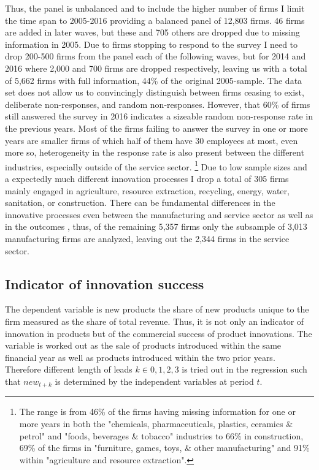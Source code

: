 Thus, the panel is unbalanced and to include the higher number of firms I limit the time span to 2005-2016 providing a balanced panel of 12,803 firms. 46 firms are added in later waves, but these and 705 others are dropped due to missing information in 2005. Due to firms stopping to respond to the survey I need to drop 200-500 firms from the panel each of the following waves, but for 2014 and 2016 where 2,000 and 700 firms are dropped respectively, leaving us with a total of 5,662 firms with full information, 44\% of the original 2005-sample. The data set does not allow us to  convincingly distinguish between firms ceasing to exist, deliberate non-responses, and random non-responses. However, that 60\% of firms still answered the survey in 2016 indicates a sizeable random non-response rate in the previous years. Most of the firms failing to answer the survey in one or more years are smaller firms of which half of them have 30 employees at most, even more so, heterogeneity in the response rate is also present between the different industries, especially outside of the service sector.
\footnote{The range is from 46\% of the firms having missing information for one or more years in both the "chemicals, pharmaceuticals, plastics, ceramics \& petrol" and "foods, beverages \& tobacco" industries to 66\% in construction, 69\% of the firms in "furniture, games, toys, \& other manufacturing" and 91\% within "agriculture and resource extraction".}
Due to low sample sizes and a expectedly much different innovation processes I drop a total of 305 firms mainly engaged in agriculture, resource extraction, recycling, energy, water, sanitation, or construction. There can be fundamental differences in the innovative processes even between the manufacturing and service sector \citep{hoffman1998small} as well as in the outcomes \citep{harrison2014does}, thus, of the remaining 5,357 firms only the subsample of 3,013 manufacturing firms are analyzed, leaving out the 2,344 firms in the service sector.

\subsection{Indicator of innovation success}
\label{subsec:proxies}
The dependent variable is new products the share of new products unique to the firm measured as the share of total revenue. Thus, it is not only an indicator of innovation in products but of the commercial success of product innovations. The variable is worked out as the sale of products introduced within the same financial year as well as products introduced within the two prior years. Therefore different length of leads $k\in0,1,2,3$ is tried out in the regression such that $new_{t+k}$ is determined by the independent variables at period $t$.

